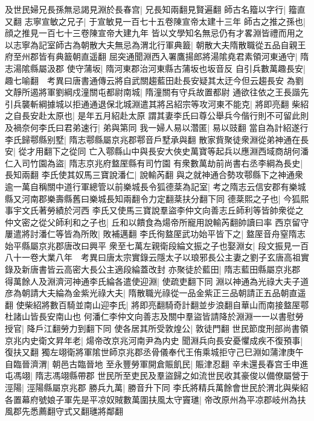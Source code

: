 及世民婦兄長孫無忌謁見淵於長春宫|{
	兄長知兩翻見賢遍翻}
師古名籀以字行|{
	籀直又翻}
志寧宣敏之兄子|{
	于宣敏見一百七十五卷陳宣帝太建十三年}
師古之推之孫也|{
	顔之推見一百七十三卷陳宣帝大建九年}
皆以文學知名無忌仍有才畧淵皆禮而用之以志寧為記室師古為朝散大夫無忌為渭北行軍典籖|{
	朝散大夫隋散職從五品自親王府至州郡皆有典籖朝直遥翻}
屈突通聞淵西入署鷹揚郎將湯隂堯君素領河東通守|{
	隋志湯隂縣屬汲郡}
使守蒲坂|{
	隋河東郡治河東縣古蒲坂也坂音反}
自引兵數萬趣長安|{
	趣七喻翻　考異曰唐書通傳云將自武關趨藍田赴長安疑其太迂今但云趨長安}
為劉文靜所遏將軍劉綱戍潼關屯都尉南城|{
	隋潼關有守兵故置都尉}
通欲往依之王長諧先引兵襲斬綱據城以拒通通退保北城淵遣其將呂紹宗等攻河東不能克|{
	將即亮翻}
柴紹之自長安赴太原也|{
	是年五月紹赴太原}
謂其妻李氏曰尊公舉兵今偕行則不可留此則及禍奈何李氏曰君弟速行|{
	弟與第同}
我一婦人易以濳匿|{
	易以豉翻}
當自為計紹遂行李氏歸鄠縣别墅|{
	隋志鄠縣屬京兆郡鄠音戶墅承與翻}
散家貲聚徒衆淵從弟神通在長安|{
	從才用翻下之從同}
亡入鄠縣山中與長安大俠史萬寶等起兵以應淵西域商胡何潘仁入司竹園為盜|{
	隋志京兆府盩厔縣有司竹園}
有衆數萬劫前尚書右丞李綱為長史|{
	長知兩翻}
李氏使其奴馬三寶說潘仁|{
	說輸芮翻}
與之就神通合勢攻鄠縣下之神通衆逾一萬自稱關中道行軍總管以前樂城長令狐德棻為記室|{
	考之隋志云信安郡有樂城縣又河南郡樂壽縣舊曰樂城長知兩翻令力定翻棻扶分翻下同}
德棻熙之子也|{
	今狐熙事宇文氏著勞績於河西}
李氏又使馬三寶說羣盜李仲文向善志丘師利等皆帥衆從之仲文密之從父師利和之子也|{
	丘和以饋食為煬帝所寵用說輸芮翻帥讀曰率}
西京留守屢遣將討潘仁等皆為所敗|{
	敗補邁翻}
李氏徇盩厔武功始平皆下之|{
	盩厔音舟窒隋志始平縣屬京兆郡唐改曰興平}
衆至七萬左親衛段綸文振之子也娶淵女|{
	段文振見一百八十一卷大業八年　考異曰唐太宗實錄云隱太子以琅邪長公主妻之劉子玄唐高祖實錄及新唐書皆云高密大長公主適段綸蓋改封}
亦聚徒於藍田|{
	隋志藍田縣屬京兆郡}
得萬餘人及淵濟河神通李氏綸各遣使迎淵|{
	使疏吏翻下同}
淵以神通為光祿大夫子道彦為朝請大夫綸為金紫光祿大夫|{
	隋散職光祿從一品金紫正三品朝請正五品朝直遥翻}
使柴紹將數百騎並南山迎李氏|{
	將即亮翻騎奇計翻並步浪翻自華山而南接盩厔鄠杜諸山皆長安南山也}
何潘仁李仲文向善志及關中羣盜皆請降於淵淵一一以書慰勞授官|{
	降戶江翻勞力到翻下同}
使各居其所受敦煌公|{
	敦徒門翻}
世民節度刑部尚書領京兆内史衛文昇年老|{
	煬帝改京兆河南尹為内史}
聞淵兵向長安憂懼成疾不復預事|{
	復扶又翻}
獨左翊衛將軍隂世師京兆郡丞骨儀奉代王侑乘城拒守己巳淵如蒲津庚午自臨晉濟渭|{
	朝邑古臨晉地}
至永豐勞軍開倉賑飢民|{
	賑津忍翻}
辛未還長春宫壬申進屯馮翊|{
	隋志馮翊縣帶郡}
世民所至吏民及羣盜歸之如流世民收其豪俊以備僚屬營于涇陽|{
	涇陽縣屬京兆郡}
勝兵九萬|{
	勝音升下同}
李氏將精兵萬餘會世民於渭北與柴紹各置幕府號娘子軍先是平凉奴賊數萬圍扶風太守竇璡|{
	帝改原州為平凉郡岐州為扶風郡先悉薦翻守式又翻璡將鄰翻}
